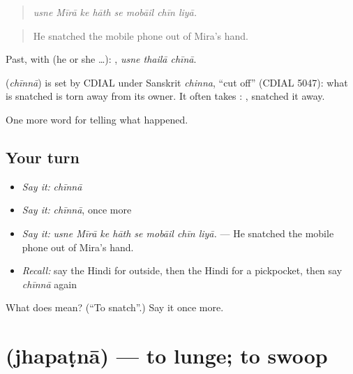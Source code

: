\begin{quote}
       
\end{quote}

\begin{quote}
\emph{usne Mīrā ke hāth se mobāil chīn liyā.}
\end{quote}

\begin{quote}
He snatched the mobile phone out of Mira's hand.
\end{quote}

Past, with  (he or she …):   , \emph{usne thailā chīnā}.

\begin{cousinweb}
\textbf{} (\emph{chīnnā}) is set by CDIAL under Sanskrit \emph{chinna}, \textquotedblleft{}cut off\textquotedblright{} (CDIAL 5047): what is snatched is torn away from its owner. It often takes \textbf{}: \textbf{ }, snatched it away.
\end{cousinweb}

\begin{grammarlens}[title={What you've built}]
One more word for telling what happened.
\end{grammarlens}

\subsection*{Your turn}
\begin{itemize}
\raggedright
  \item \emph{Say it:} \emph{chīnnā}
  \item \emph{Say it:} \emph{chīnnā}, once more
  \item \emph{Say it:} \emph{usne Mīrā ke hāth se mobāil chīn liyā.} — He snatched the mobile phone out of Mira's hand.
  \item \emph{Recall:} say the Hindi for outside, then the Hindi for a pickpocket, then say \emph{chīnnā} again
\end{itemize}

\begin{tcolorbox}[breakable,colback=teal!4,colframe=teal!35!black,title={Before you move on}]
What does  mean? (\textquotedblleft{}To snatch\textquotedblright{}.) Say it once more.
\end{tcolorbox}
\section[\texorpdfstring{\hi{झपटना} (jhapaṭnā)}{झपटना (jhapaṭnā)}]{ (jhapaṭnā) — to lunge; to swoop}

